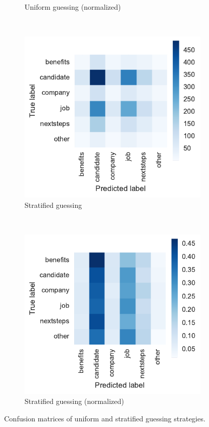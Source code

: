 \begin{figure}
\begin{subfigure}[b]{0.48\textwidth}
        \caption{Uniform guessing (normalized)}
\label{fig:guessing-conf-matrix-uniform-normalized}
    \end{subfigure}
~\begin{subfigure}[b]{0.47\textwidth}
        \includegraphics[width=\textwidth]{img/exp-vector-space/guessing-conf-matrix-stratified.pdf}
        \caption{Stratified guessing}
\label{fig:guessing-conf-matrix-stratified}
    \end{subfigure}
~\begin{subfigure}[b]{0.48\textwidth}
        \includegraphics[width=\textwidth]{img/exp-vector-space/guessing-conf-matrix-stratified-normalized.pdf}
        \caption{Stratified guessing (normalized)}
\label{fig:guessing-stratified-normalized}
    \end{subfigure}
    \caption{Confusion matrices of uniform and stratified guessing strategies.}
\label{fig:guessing-conf-matrix}
\end{figure}

